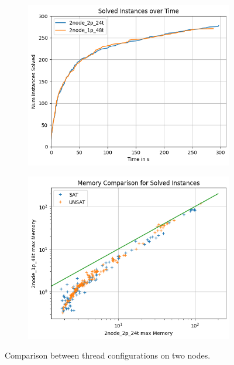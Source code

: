 \documentclass[12pt,a4paper,twoside]{scrartcl}
\numberwithin{equation}{section}
\begin{document}
\begin{figure}
  \center
  \begin{subfigure}[c]{0.4\textwidth}
    \center
    \includegraphics[scale=0.5]{plots/config_compare/2node_config_compare.png}
    \caption{}
    \label{2nodeConfigRuntimeCompare}
  \end{subfigure}
  \hfill
  \begin{subfigure}[c]{0.4\textwidth}
    \center
    \includegraphics[scale=0.5]{plots/config_compare/2node_config_mem_compare.png}
    \caption{}
    \label{fig:2nodeConfigMemCompare}
  \end{subfigure}
  \caption{Comparison between thread configurations on two nodes.}
  \label{fig:2nodeConfigCompare}
\end{figure}
\end{document}
